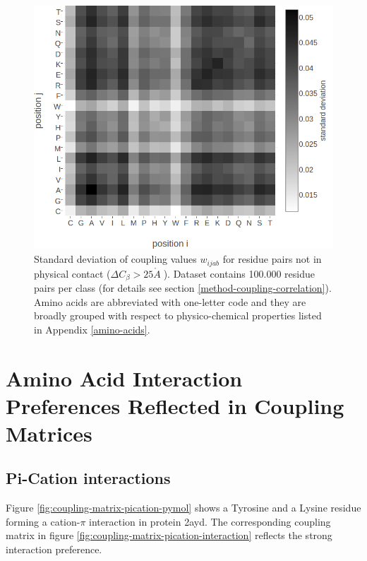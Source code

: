 \documentclass[11pt,a4paper,twoside]{book}
\newcommand{\Cb}{C_\beta}
\newcommand{\wijab}{w_{ijab}}
\newcommand{\angstrom}{\mathring{A} \;}
\theoremstyle{definition}
\theoremstyle{definition}
\theoremstyle{remark}
\begin{document}
\begin{figure}
\includegraphics[width=1\linewidth]{img/coupling_matrix_analysis/stdev_couplings_noncontacts_heatmap_notitle} \caption{Standard deviation of
coupling values \(\wijab\) for residue pairs not in physical contact
(\(\Delta \Cb > 25 \angstrom\)). Dataset contains 100.000 residue pairs
per class (for details see section \ref{method-coupling-correlation}).
Amino acids are abbreviated with one-letter code and they are broadly
grouped with respect to physico-chemical properties listed in Appendix
\ref{amino-acids}.}\label{fig:stdev-raw-couplings-noncontacts}
\end{figure}

\chapter{Amino Acid Interaction Preferences Reflected in Coupling
Matrices}\label{amino-acid-interaction-preferences-reflected-in-coupling-matrices}

\section{Pi-Cation interactions}\label{pi-cation}

Figure \ref{fig:coupling-matrix-pication-pymol} shows a Tyrosine and a
Lysine residue forming a cation-\(\pi\) interaction in protein 2ayd. The
corresponding coupling matrix in figure
\ref{fig:coupling-matrix-pication-interaction} reflects the strong
interaction preference.
\end{document}
